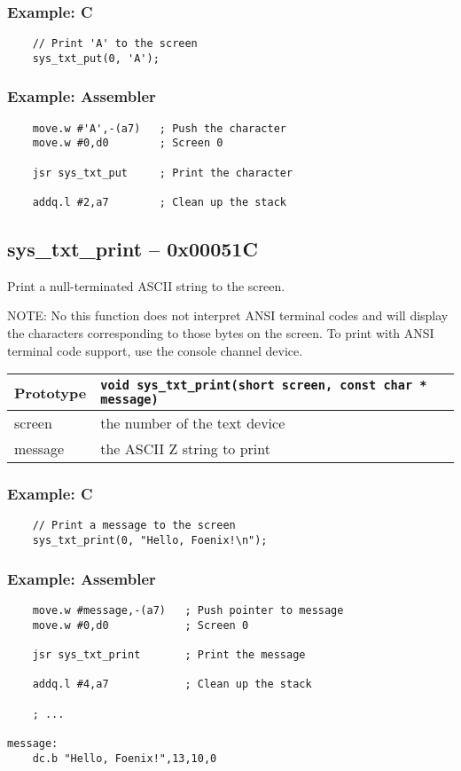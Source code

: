 \subsubsection*{Example: C}
\begin{lstlisting}
    // Print 'A' to the screen
    sys_txt_put(0, 'A');
\end{lstlisting}

\subsubsection*{Example: Assembler}
\begin{verbatim}
    move.w #'A',-(a7)   ; Push the character
    move.w #0,d0        ; Screen 0
    
    jsr sys_txt_put     ; Print the character

    addq.l #2,a7        ; Clean up the stack
\end{verbatim}

\subsection*{sys\_txt\_print -- 0x00051C}
Print a null-terminated ASCII string to the screen.

NOTE: No this function does not interpret ANSI terminal codes and will display
the characters corresponding to those bytes on the screen. To print with ANSI
terminal code support, use the console channel device.

\bigskip

\begin{tabular}{|l||l|} \hline
Prototype & \lstinline!void sys_txt_print(short screen, const char * message)! \\ \hline
screen & the number of the text device \\ \hline
message & the ASCII Z string to print \\ \hline
\end{tabular}

\subsubsection*{Example: C}
\begin{lstlisting}
    // Print a message to the screen
    sys_txt_print(0, "Hello, Foenix!\n");
\end{lstlisting}

\subsubsection*{Example: Assembler}
\begin{verbatim}
    move.w #message,-(a7)   ; Push pointer to message
    move.w #0,d0            ; Screen 0

    jsr sys_txt_print       ; Print the message

    addq.l #4,a7            ; Clean up the stack

    ; ...

message:
    dc.b "Hello, Foenix!",13,10,0
\end{verbatim}